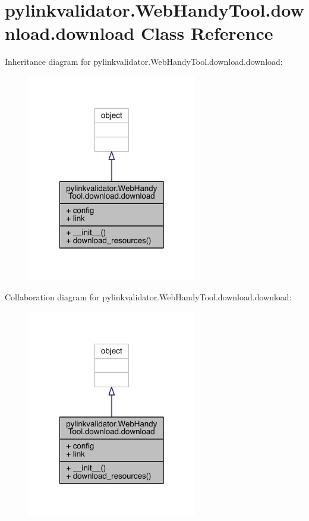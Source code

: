 \hypertarget{classpylinkvalidator_1_1_web_handy_tool_1_1download_1_1download}{}\section{pylinkvalidator.\+Web\+Handy\+Tool.\+download.\+download Class Reference}
\label{classpylinkvalidator_1_1_web_handy_tool_1_1download_1_1download}


Inheritance diagram for pylinkvalidator.\+Web\+Handy\+Tool.\+download.\+download\+:
\nopagebreak
\begin{figure}[H]
\begin{center}
\leavevmode
\includegraphics[width=210pt]{classpylinkvalidator_1_1_web_handy_tool_1_1download_1_1download__inherit__graph}
\end{center}
\end{figure}


Collaboration diagram for pylinkvalidator.\+Web\+Handy\+Tool.\+download.\+download\+:
\nopagebreak
\begin{figure}[H]
\begin{center}
\leavevmode
\includegraphics[width=210pt]{classpylinkvalidator_1_1_web_handy_tool_1_1download_1_1download__coll__graph}
\end{center}
\end{figure}
